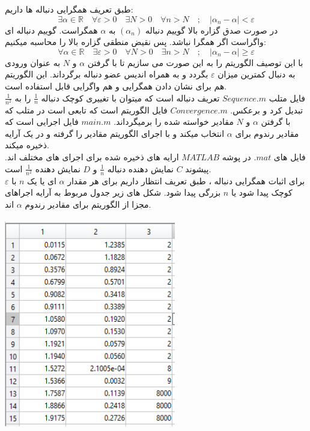 \documentclass[12pt, letterpaper]{article}
\begin{document}
طبق تعریف همگرایی دنباله ها داریم:
\[\exists \! \alpha\! \in\! \mathbb{R} \quad \forall \varepsilon \! > \! 0 \quad \exists N\! > \! 0 \quad \forall n\! >\! N\quad ; \quad \big| \alpha_{n} - \alpha \big|\! <\! \varepsilon \]
در صورت صدق گزاره بالا گوییم دنباله 
\((\alpha_{n})\)
به 
$\alpha$
همگراست. گوییم دنباله ای واگراست اگر همگرا نباشد. پس نقیض منطقی گزاره بالا را محاسبه میکنیم:
\[\forall \! \alpha\! \in\! \mathbb{R} \quad \exists \varepsilon \! > \! 0 \quad \forall N\! > \! 0 \quad \exists n\! >\! N\quad ; \quad \big| \alpha_{n} - \alpha \big|\! \ge\! \varepsilon \]
با این توصیف الگوریتم را به این صورت می سازیم تا با گرفتن 
$\alpha$
 و 
$N$
به عنوان ورودی به دنبال کمترین میزان 
$\varepsilon$
 بگردد و به همراه اندیس عضو دنباله برگرداند. این الگوریتم هم برای نشان دادن همگرایی و هم واگرایی قابل استفاده است.
\\
فایل متلب 
$Sequence.m$
تعریف دنباله است که میتوان با تغییری کوچک دنباله 
$\frac{1}{n}$
را به 
$\frac{1}{n^2}$
 تبدیل کرد و برعکس. 
$Convergence.m$
فایل الگوریتم است که تابعی است در متلب که با گرفتن 
$\alpha$ 
 و 
$N$
مقادیر خواسته شده را برمیگرداند.
$main.m$
 فایل اجرایی است که مقادیر رندوم برای 
$\alpha$
 انتخاب میکند و با اجرای الگوریتم مقادیر را گرفته و در یک آرایه ذخیره میکند.
\\
 فایل های 
$.mat$
در پوشه 
$MATLAB$
 ارایه های ذخیره شده برای اجرای های مختلف اند. پیشوند 
$C$
 نمایش دهنده دنباله 
$\frac{1}{n}$ و $D$
نمایش دهنده
 $\frac{1}{n^2}$ 
است. 
\\
برای اثبات همگرایی دنباله ، طبق تعریف انتظار داریم برای هر مقدار 
$\alpha$ 
ای یا یک $n$ 
با $\varepsilon$
 کوچک پیدا شود یا
 $n$ 
بزرگی پیدا شود. شکل های زیر جدول مربوط به آرایه اجراهای مجزا از الگوریتم برای مقادیر رندوم 
$\alpha$
 اند.
\\
\includegraphics[height=10cm, width=75mm]{figure3.png}
\end{document}
